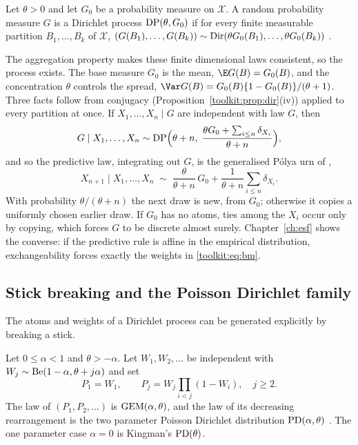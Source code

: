 \begin{definition}\label{toolkit:def:dp}
Let $\theta>0$ and let $G_0$ be a probability measure on $\mathcal{X}$. A random probability
measure $G$ is a Dirichlet process $\mathrm{DP}(\theta,G_0)$ if for every finite measurable partition
$B_1,\dots,B_k$ of $\mathcal{X}$,
$(G(B_1),\dots,G(B_k))\sim\mathrm{Dir}(\theta G_0(B_1),\dots,\theta G_0(B_k))$
\citep{toolkit:ferguson1973}.
\end{definition}

The aggregation property makes these finite dimensional laws consistent, so the process exists.
The base measure $G_0$ is the mean, $\E G(B)=G_0(B)$, and the concentration $\theta$ controls the
spread, $\Var G(B)=G_0(B)\{1-G_0(B)\}/(\theta+1)$. Three facts follow from conjugacy
(Proposition~\ref{toolkit:prop:dir}(iv)) applied to every partition at once. If
$X_1,\dots,X_n\mid G$ are independent with law $G$, then
\begin{equation}\label{toolkit:eq:dppost}
G\mid X_1,\dots,X_n\sim\mathrm{DP}\Big(\theta+n,\;\frac{\theta G_0+\sum_{i\le n}\delta_{X_i}}{\theta+n}\Big),
\end{equation}
and so the predictive law, integrating out $G$, is the generalised P\'olya urn of
\citet{toolkit:blackwell1973},
\begin{equation}\label{toolkit:eq:bm}
X_{n+1}\mid X_1,\dots,X_n\;\sim\;\frac{\theta}{\theta+n}\,G_0+\frac{1}{\theta+n}\sum_{i\le n}\delta_{X_i}.
\end{equation}
With probability $\theta/(\theta+n)$ the next draw is new, from $G_0$; otherwise it copies a
uniformly chosen earlier draw. If $G_0$ has no atoms, ties among the $X_i$ occur only by copying,
which forces $G$ to be discrete almost surely. Chapter~\ref{ch:esf} shows the converse: if the
predictive rule is affine in the empirical distribution, exchangeability forces exactly the
weights in \eqref{toolkit:eq:bm}.

\subsection{Stick breaking and the Poisson Dirichlet family}\label{toolkit:sec:stick}

The atoms and weights of a Dirichlet process can be generated explicitly by breaking a stick.

\begin{definition}\label{toolkit:def:gem}
Let $0\le\alpha<1$ and $\theta>-\alpha$. Let $W_1,W_2,\dots$ be independent with
$W_j\sim\mathrm{Be}(1-\alpha,\theta+j\alpha)$ and set
\[
P_1=W_1,\qquad P_j=W_j\prod_{i<j}(1-W_i),\quad j\ge2 .
\]
The law of $(P_1,P_2,\dots)$ is $\mathrm{GEM}(\alpha,\theta)$, and the law of its decreasing rearrangement
is the two parameter Poisson Dirichlet distribution $\mathrm{PD}(\alpha,\theta)$
\citep{toolkit:pitmanyor1997}. The one parameter case $\alpha=0$ is Kingman's $\mathrm{PD}(\theta)$.
\end{definition}

